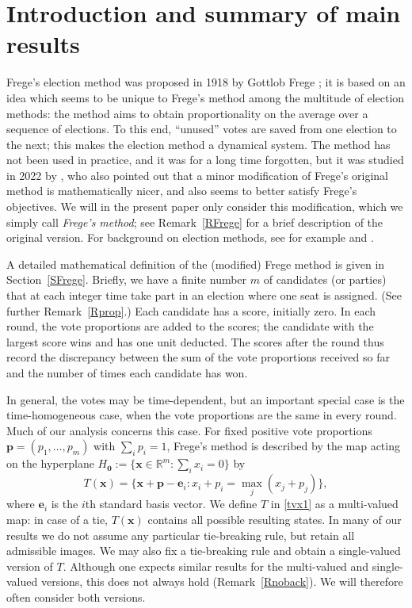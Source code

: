 \documentclass[11pt,reqno,tbtags,a4paper]{amsart}
\numberwithin{equation}{section}
\theoremstyle{plain}%
\theoremstyle{definition}
\theoremstyle{remark}
\newcommand{\refR}[1]{Remark~\ref{#1}}
\newcommand{\refS}[1]{Section~\ref{#1}}
\newcommand\bbR{\mathbb R}
\newcommand\Ho{H_{\0}}
\newcommand\ve{\mathbf{e}}
\newcommand\vp{\mathbf{p}}
\newcommand\vx{\mathbf{x}}
\newcommand\0{{\boldsymbol 0}}
\newcommand\1{{\boldsymbol 1}}
\begin{document}
\section{Introduction and summary of main results}\label{S:intro}
Frege's election method was proposed in 1918 by Gottlob Frege \cite{Frege};
it is based on an idea which seems to be unique to Frege's method
among the multitude of election methods:
the method aims to obtain proportionality
on the average over a sequence of elections.
To this end, ``unused'' votes are saved from one election
to the next; this makes the election method a dynamical system.
The method has not been used in practice, and
it was for a long time forgotten, but it was studied in 2022
by \citet{HLL}, who also pointed out that a minor modification of Frege's
original method is mathematically nicer, and also seems to better satisfy
Frege's objectives.
We will in the present paper only consider this modification, which we
simply call \emph{Frege's method};
see \refR{RFrege} for a brief description of the original version.
For background on election methods, see for example
\citet{BY} and \citet{Pukelsheim}.

A detailed mathematical definition of the (modified) Frege method is given
in \refS{SFrege}. Briefly, we have a finite number $m$ of candidates (or
parties) that at each integer time take part in an election where one seat is
assigned. (See further \refR{Rprop}.)
Each candidate has a score, initially zero.
In each round, the vote proportions are added to the scores;
the candidate with the largest score wins and has one unit deducted.
The scores after the round thus record the discrepancy between the sum of
the vote proportions received so far and the number of times each candidate has
won.

In general, the votes may be time-dependent, but an important special case
is the time-homogeneous case, when the vote proportions are the same in
every round. Much of our analysis concerns this case.
For fixed positive vote proportions $\vp=(p_1,\dots,p_m)$ with $\sum_i p_i=1$,
Frege's method is described by the map acting on the hyperplane
$\Ho:=\{\vx\in\bbR^m:\sum_i x_i=0\}$ by
\begin{equation}\label{tvx1}
 T(\vx)=
 \bigl\{\vx+\vp-\ve_i:x_i+p_i=\max_j(x_j+p_j)\bigr\},
\end{equation}
where $\ve_i$ is the $i$th standard basis vector.
We define $T$ in \eqref{tvx1} as a multi-valued map:
in case of a tie, $T(\vx)$ contains all possible resulting states.
In many of our results we do not assume any particular tie-breaking rule,
but retain all admissible images.
We may also fix a tie-breaking rule and obtain a single-valued version of $T$.
Although one expects similar results for the multi-valued and single-valued
versions, this does not always hold (\refR{Rnoback}).
We will therefore often consider both versions.
\end{document}
